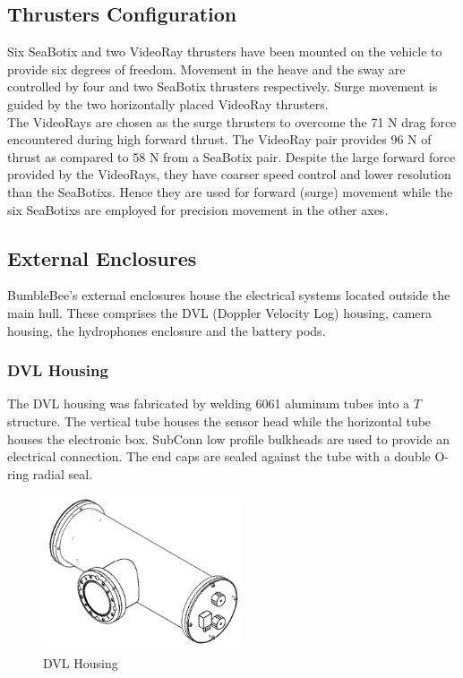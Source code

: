\documentclass[journal,12pt]{IEEEtran}
\begin{document}
\subsection{Thrusters Configuration}
Six SeaBotix and two VideoRay thrusters have been mounted on the vehicle to provide six degrees of freedom. Movement in the heave and the sway are controlled by four and two SeaBotix thrusters respectively. Surge movement is guided by the two horizontally placed VideoRay thrusters. \\

The VideoRays are chosen as the surge thrusters to overcome the 71 N drag force encountered during high forward thrust. The VideoRay pair provides 96 N of thrust as compared to 58 N from a SeaBotix pair. Despite the large forward force provided by the VideoRays, they have coarser speed control and lower resolution than the SeaBotixs. Hence they are used for forward (surge) movement while the six SeaBotixs are employed for precision movement in the other axes. 

\subsection{External Enclosures}
BumbleBee's external enclosures house the electrical systems located outside the main hull. These comprises the DVL (Doppler Velocity Log) housing, camera housing, the hydrophones enclosure and the battery pods. \\

\subsubsection{DVL Housing}
The DVL housing was fabricated by welding 6061 aluminum tubes into a $T$ structure. The vertical tube houses the sensor head while the horizontal tube houses the electronic box. SubConn low profile bulkheads are used to provide an electrical connection. The end caps are sealed against the tube with a double O-ring radial seal. \\

\begin{figure}[h]
\centering
\includegraphics[width=2.3in]{DVLHousingbnw.png}
\caption{DVL Housing}
\end{figure}
\end{document}
